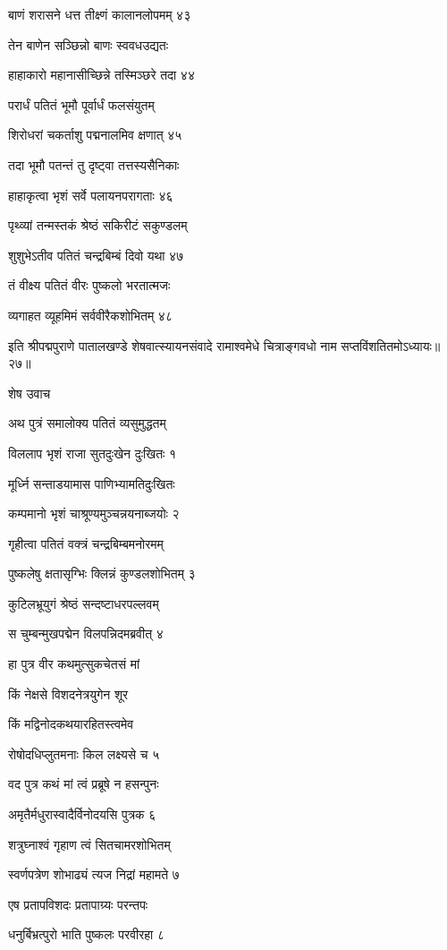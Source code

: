 बाणं शरासने धत्त तीक्ष्णं कालानलोपमम् ४३

तेन बाणेन सञ्छिन्नो बाणः स्ववधउद्यतः

हाहाकारो महानासीच्छिन्ने तस्मिञ्छरे तदा ४४

परार्धं पतितं भूमौ पूर्वार्धं फलसंयुतम्

शिरोधरां चकर्ताशु पद्मनालमिव क्षणात् ४५

तदा भूमौ पतन्तं तु दृष्ट्वा तत्तस्यसैनिकाः

हाहाकृत्वा भृशं सर्वे पलायनपरागताः ४६

पृथ्व्यां तन्मस्तकं श्रेष्ठं सकिरीटं सकुण्डलम्

शुशुभेऽतीव पतितं चन्द्रबिम्बं दिवो यथा ४७

तं वीक्ष्य पतितं वीरः पुष्कलो भरतात्मजः

व्यगाहत व्यूहमिमं सर्ववीरैकशोभितम् ४८

इति श्रीपद्मपुराणे पातालखण्डे शेषवात्स्यायनसंवादे रामाश्वमेधे चित्राङ्गवधो नाम सप्तविंशतितमोऽध्यायः॥२७॥


शेष उवाच

अथ पुत्रं समालोक्य पतितं व्यसुमुद्धतम्

विललाप भृशं राजा सुतदुःखेन दुःखितः १

मूर्ध्नि सन्ताडयामास पाणिभ्यामतिदुःखितः

कम्पमानो भृशं चाश्रूण्यमुञ्चन्नयनाब्जयोः २

गृहीत्वा पतितं वक्त्रं चन्द्रबिम्बमनोरमम्

पुष्कलेषु क्षतासृग्भिः क्लिन्नं कुण्डलशोभितम् ३

कुटिलभ्रूयुगं श्रेष्ठं सन्दष्टाधरपल्लवम्

स चुम्बन्मुखपद्मेन विलपन्निदमब्रवीत् ४

हा पुत्र वीर कथमुत्सुकचेतसं मां

किं नेक्षसे विशदनेत्रयुगेन शूर

किं मद्विनोदकथयारहितस्त्वमेव

रोषोदधिप्लुतमनाः किल लक्ष्यसे च ५

वद पुत्र कथं मां त्वं प्रब्रूषे न हसन्पुनः

अमृतैर्मधुरास्वादैर्विनोदयसि पुत्रक ६

शत्रुघ्नाश्वं गृहाण त्वं सितचामरशोभितम्

स्वर्णपत्रेण शोभाढ्यं त्यज निद्रां महामते ७

एष प्रतापविशदः प्रतापाग्र्यः परन्तपः

धनुर्बिभ्रत्पुरो भाति पुष्कलः परवीरहा ८

